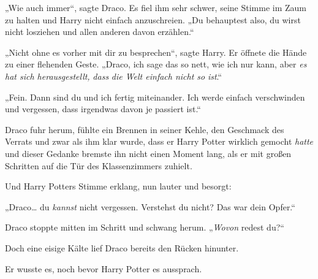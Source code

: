 „Wie auch immer“, sagte Draco. Es fiel ihm sehr schwer, seine Stimme im Zaum zu halten und Harry nicht einfach anzuschreien. „Du behauptest also, du wirst nicht losziehen und allen anderen davon erzählen.“

„Nicht ohne es vorher mit dir zu besprechen“, sagte Harry. Er öffnete die Hände zu einer flehenden Geste. „Draco, ich sage das so nett, wie ich nur kann, aber \emph{es hat sich herausgestellt,} \emph{dass} \emph{die Welt einfach nicht so} \emph{ist}.“

„Fein. Dann sind du und ich fertig miteinander. Ich werde einfach verschwinden und vergessen, dass irgendwas davon je passiert ist.“

Draco fuhr herum, fühlte ein Brennen in seiner Kehle, den Geschmack des Verrats und zwar als ihm klar wurde, dass er Harry Potter wirklich gemocht \emph{hatte} und dieser Gedanke bremste ihn nicht einen Moment lang, als er mit großen Schritten auf die Tür des Klassenzimmers zuhielt.

Und Harry Potters Stimme erklang, nun lauter und besorgt:

„Draco… du \emph{kannst} nicht vergessen. Verstehst du nicht? Das war dein Opfer.“

Draco stoppte mitten im Schritt und schwang herum. „\emph{Wovon} redest du?“

Doch eine eisige Kälte lief Draco bereits den Rücken hinunter.

Er wusste es, noch bevor Harry Potter es aussprach.

